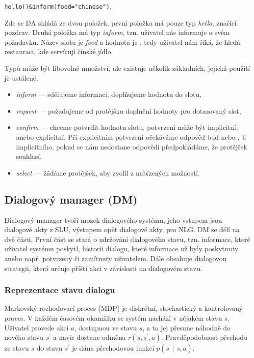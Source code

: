 \begin{center}
{\tt hello()\&inform(food="chinese")}.
\end{center}

Zde se DA skládá ze dvou položek, první položka má pouze typ {\em hello}, značící pozdrav. 
Druhá položka má typ {\em inform}, tzn. uživatel nás informuje o svém požadavku.
Název slotu je {\em food} a hodnota je , tedy uživatel nám říká, že hledá restauraci, kde servírují čínské jídlo.

Typů může být libovolné množství, ale existuje několik základních, jejichž použití je ustálené. 
\begin{itemize}
\item {\em inform} --- sdělujeme informaci, doplňujeme hodnotu do slotu,
\item {\em request} --- požadujeme od protějšku doplnění hodnoty pro dotazovaný slot,
\item {\em confirm} --- chceme potvrdit hodnotu slotu, potvrzení může být implicitní, anebo explicitní. 
	Při explicitním potvrzení očekáváme odpověď buď  nebo ,
	U implicitního, pokud se nám nedostane odpovědi předpokládáme, že protějšek souhlasí,
\item {\em select} --- žádáme protějšek, aby zvolil z nabízených možností.
\end{itemize}

\subsection{Dialogový manager (DM)}

Dialogový manager tvoří mozek dialogového systému, jeho vstupem jsou dialogové akty z SLU, výstupem opět dialogové akty, pro NLG.
DM se dělí na dvě části. 
První část se stará o udržování dialogového stavu, tzn. informace, které uživatel systému poskytl, historii dialogu, které informace už byly poskytnuty anebo např. potvrzeny či zamítnuty uživatelem.
Dále obsahuje dialogovou strategii, která určuje příští akci v závislosti na dialogovém stavu.

\subsubsection{Reprezentace stavu dialogu}

Markovský rozhodovací proces (MDP) \cite{puterman2009markov} je diskrétní, stochastický a kontrolovaný proces. 
V každém časovém okamžiku se systém nachází v nějakém stavu $s$. 
Uživatel provede akci $a$, dostupnou ve stavu $s$, a ta jej přesune náhodně do nového stavu $s^\prime$ a navíc dostane odměnu $r(s, s^\prime, a)$.
Pravděpodobnost přechodu ze stavu $s$ do stavu $s^\prime$ je dána přechodovou funkcí $p(s^\prime \mid s, a)$.

